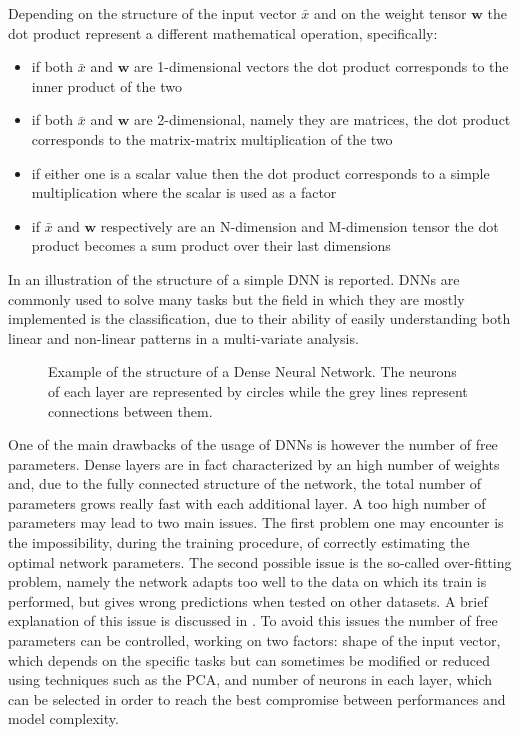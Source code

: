 Depending on the structure of the input vector $\bar{x}$ and on the weight tensor $\boldsymbol{w}$ the dot product represent a different mathematical operation, specifically:
\begin{itemize}
    \item if both $\bar{x}$ and $\boldsymbol{w}$ are 1-dimensional vectors the dot product corresponds to the inner product of the two
    \item if both $\bar{x}$ and $\boldsymbol{w}$ are 2-dimensional, namely they are matrices, the dot product corresponds to the matrix-matrix multiplication of the two
     \item if either one is a scalar value then the dot product corresponds to a simple multiplication where the scalar is used as a factor
     \item if $\bar{x}$ and $\boldsymbol{w}$ respectively are an N-dimension and M-dimension tensor the dot product becomes a sum product over their last dimensions
\end{itemize}

In  an illustration of the structure of a simple DNN is reported. DNNs are commonly used to solve many tasks but the field in which they are mostly implemented is the classification, due to their ability of easily understanding both linear and non-linear patterns in a multi-variate analysis.


\begin{figure}
    \centering

    \caption{Example of the structure of a Dense Neural Network. The neurons of each layer are represented by circles while the grey lines represent connections between them.}
    \label{fig:dnn_example}
\end{figure}

One of the main drawbacks of the usage of DNNs is however the number of free parameters. Dense layers are in fact characterized by an high number of weights and, due to the fully connected structure of the network, the total number of parameters grows really fast with each additional layer. 
A too high number of parameters may lead to two main issues. The first problem one may encounter is the impossibility, during the training procedure, of correctly estimating the optimal network parameters. The second possible issue is the so-called over-fitting problem, namely the network adapts too well to the data on which its train is performed, but gives wrong predictions when tested on other datasets. A brief explanation of this issue is discussed in .
To avoid this issues the number of free parameters can be controlled, working on two factors:  shape of the input vector, which depends on the specific tasks but can sometimes be modified or reduced using techniques such as the PCA\cite{pca}, and  number of neurons in each layer, which can be selected in order to reach the best compromise between performances and model complexity.

